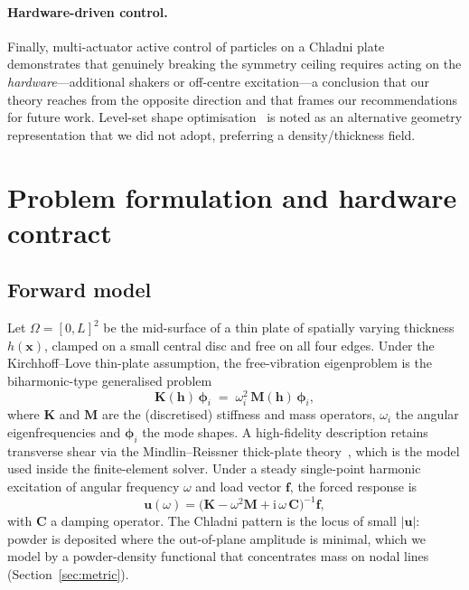 \documentclass[11pt,a4paper]{article}
\newcommand{\matK}{\mathbf{K}}
\newcommand{\matM}{\mathbf{M}}
\begin{document}
\paragraph{Hardware-driven control.}
Finally, multi-actuator active control of particles on a Chladni
plate~\cite{zhou2016} demonstrates that genuinely breaking the symmetry ceiling
requires acting on the \emph{hardware}---additional shakers or off-centre
excitation---a conclusion that our theory reaches from the opposite direction and
that frames our recommendations for future work. Level-set shape
optimisation~\cite{allaire2004} is noted as an alternative geometry representation
that we did not adopt, preferring a density/thickness field.

\section{Problem formulation and hardware contract}\label{sec:contract}

\subsection{Forward model}
Let $\Omega=[0,L]^2$ be the mid-surface of a thin plate of spatially varying
thickness $h(\bm{x})$, clamped on a small central disc and free on all four
edges. Under the Kirchhoff--Love thin-plate assumption, the free-vibration
eigenproblem is the biharmonic-type generalised problem
\begin{equation}
\matK(\bm{h})\,\bm{\phi}_i \;=\; \omega_i^2\,\matM(\bm{h})\,\bm{\phi}_i,
\label{eq:eig}
\end{equation}
where $\matK$ and $\matM$ are the (discretised) stiffness and mass operators,
$\omega_i$ the angular eigenfrequencies and $\bm{\phi}_i$ the mode shapes. A
high-fidelity description retains transverse shear via the Mindlin--Reissner
thick-plate theory~\cite{reissner1945,mindlin1951}, which is the model used inside
the finite-element solver. Under a steady single-point harmonic excitation of
angular frequency $\omega$ and load vector $\bm{f}$, the forced response is
\begin{equation}
\bm{u}(\omega)=\big(\matK-\omega^2\matM + \mathrm{i}\,\omega\,\mathbf{C}\big)^{-1}\bm{f},
\label{eq:forced}
\end{equation}
with $\mathbf{C}$ a damping operator. The Chladni pattern is the locus of small
$|\bm{u}|$: powder is deposited where the out-of-plane amplitude is minimal,
which we model by a powder-density functional that concentrates mass on nodal
lines (Section~\ref{sec:metric}).
\end{document}
